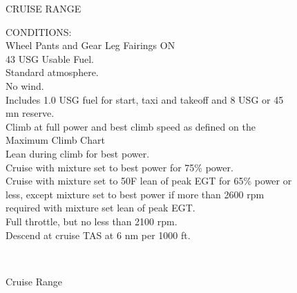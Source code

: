 \begin{figure}[t]
\begin{center}
\begin{perfhdr}CRUISE RANGE\\
\end{perfhdr}

\begin{minipage}{5in}
  \begin{flushleft}
    CONDITIONS:\\
    Wheel Pants and Gear Leg Fairings ON\\
    43 USG Usable Fuel.\\
    Standard atmosphere.\\
    No wind.\\
    Includes 1.0 USG fuel for start, taxi and takeoff and 8 USG or 45 mn reserve.\\
    Climb at full power and best climb speed as defined on the Maximum Climb Chart\\
    Lean during climb for best power.\\
    Cruise with mixture set to best power for 75\% power.  \\
    Cruise with mixture set to 50\textdegree F lean of peak EGT for 65\% power or less, except mixture set to best power if more than 2600 rpm required with mixture set lean of peak EGT.\\
    Full throttle, but no less than 2100 rpm.\\
    Descend at cruise TAS at 6 nm per 1000 ft.\\
    \end{flushleft}
\end{minipage}\\
\vspace{5ex}
\end{center}  %
\caption{Cruise Range}
\label{Cruise-range}
\end{figure}
\clearpage



